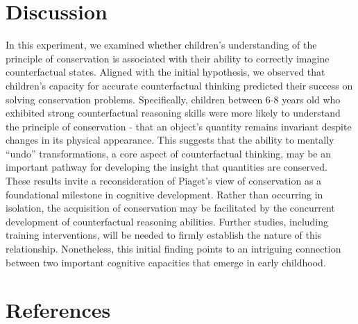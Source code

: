 \documentclass[
  doc]{apa6}
\begin{document}
\section{Discussion}\label{discussion}

In this experiment, we examined whether children's understanding of the principle of conservation is associated with their ability to correctly imagine counterfactual states.
Aligned with the initial hypothesis, we observed that children's capacity for accurate counterfactual thinking predicted their success on solving conservation problems. Specifically, children between 6-8 years old who exhibited strong counterfactual reasoning skills were more likely to understand the principle of conservation - that an object's quantity remains invariant despite changes in its physical appearance. This suggests that the ability to mentally ``undo'' transformations, a core aspect of counterfactual thinking, may be an important pathway for developing the insight that quantities are conserved. These results invite a reconsideration of Piaget's view of conservation as a foundational milestone in cognitive development. Rather than occurring in isolation, the acquisition of conservation may be facilitated by the concurrent development of counterfactual reasoning abilities. Further studies, including training interventions, will be needed to firmly establish the nature of this relationship. Nonetheless, this initial finding points to an intriguing connection between two important cognitive capacities that emerge in early childhood.

\newpage

\section{References}\label{references}
\end{document}
